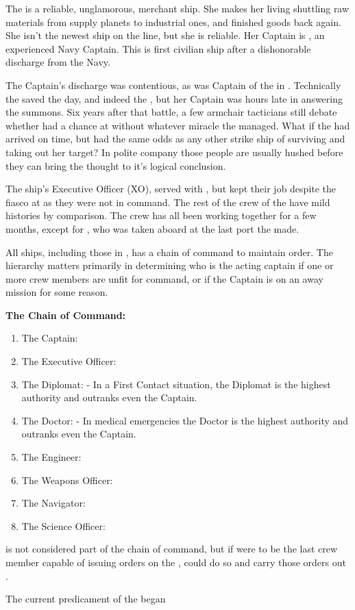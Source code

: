 \documentclass[blue]{TMFHope}
\begin{document}
\name{\bHope{}}

The \pNew{} is a reliable, unglamorous, merchant ship. She makes her living shuttling raw materials from supply planets to industrial ones, and finished goods back again. She isn't the newest ship on the line, but she is reliable. Her Captain is \cCap{}, an experienced Navy Captain. This is \cCap{\their} first civilian ship after a dishonorable discharge from the Navy.  

The Captain's discharge was contentious, as \cCap{} was Captain of the \pOld{} in \pBattle{}. Technically the \pOld{} saved the day, and indeed the \pPlan{}, but her Captain was hours late in answering the summons. Six years after that battle, a few armchair tacticians still debate whether \pPlan{} had a chance at \pHome{} without whatever miracle the \pOld{} managed. What if the \pOld{} had arrived on time, but had the same odds as any other strike ship of surviving and taking out her target? In polite company those people are usually hushed before they can bring the thought to it's logical conclusion.

The ship's Executive Officer (XO), \cXO{} served with \cCap{}, but kept their job despite the fiasco at \pBattle{} as they were not in command. The rest of the crew of the \pNew{} have mild histories by comparison. The crew has all been working together for a few months, except for \cBoy{}, who was taken aboard at the last port the \pNew{} made.

All ships, including those in \pTMF{}, has a chain of command to maintain order. The hierarchy matters primarily in determining who is the acting captain if one or more crew members are unfit for command, or if the Captain is on an away mission for some reason.

{\bf The \pNew{} Chain of Command:}
\begin{enumerate}
  \item The Captain: \cCap{}
	\item The Executive Officer: \cXO{}
	\item The Diplomat: \cDip{} - In a First Contact situation, the Diplomat is the highest authority and outranks even the Captain.
	\item The Doctor: \cMed{} - In medical emergencies the Doctor is the highest authority and outranks even the Captain.
	\item The Engineer: \cEng{}
	\item The Weapons Officer: \cWeap{}
	\item The Navigator: \cNav{}
	\item The Science Officer: \cSci{}
\end{enumerate}

\cBoy{} is not considered part of the chain of command, but if \cBoy{\they} were to be the last crew member capable of issuing orders on the \pNew{}, \cBoy{\them} could do so and carry those orders out \cBoy{\themself}.

The current predicament of the \pNew{} began
\end{document}
